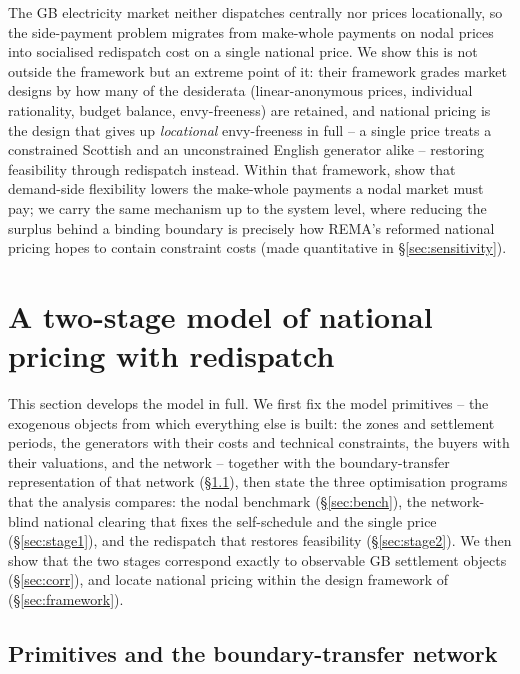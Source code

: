 \documentclass[review,3p,times]{elsarticle}
\theoremstyle{plain}
\theoremstyle{definition}
\begin{document}
The GB electricity market neither dispatches centrally nor prices locationally, so the
side-payment problem migrates from make-whole payments on nodal prices into
socialised redispatch cost on a single national price. We show this is not
outside the \citet{bichler2022} framework but an extreme point of it: their
framework grades market designs by how many of the desiderata (linear-anonymous
prices, individual rationality, budget balance, envy-freeness) are retained, and
national pricing is the design that gives up \emph{locational} envy-freeness in
full -- a single price treats a constrained Scottish and an unconstrained English
generator alike -- restoring feasibility through redispatch instead. Within that
framework, \citet{bichler2022} show that demand-side flexibility lowers the
make-whole payments a nodal market must pay; we carry the same mechanism up to the
system level, where reducing the surplus behind a binding boundary is precisely
how REMA's reformed national pricing hopes to contain constraint costs (made
quantitative in \S\ref{sec:sensitivity}).

\section{A two-stage model of national pricing with redispatch}
\label{sec:model}

This section develops the model in full. We first fix the model primitives -- the
exogenous objects from which everything else is built: the zones and settlement
periods, the generators with their costs and technical constraints, the buyers
with their valuations, and the network -- together with the boundary-transfer
representation of that network (\S\ref{sec:prim}), then state
the three optimisation programs that the analysis compares: the nodal benchmark
(\S\ref{sec:bench}), the network-blind national clearing that fixes the
self-schedule and the single price (\S\ref{sec:stage1}), and the redispatch that
restores feasibility (\S\ref{sec:stage2}). We then show that the two stages
correspond exactly to observable GB settlement objects (\S\ref{sec:corr}), and
locate national pricing within the design framework of \citet{bichler2022}
(\S\ref{sec:framework}).

\subsection{Primitives and the boundary-transfer network}
\label{sec:prim}
\end{document}
